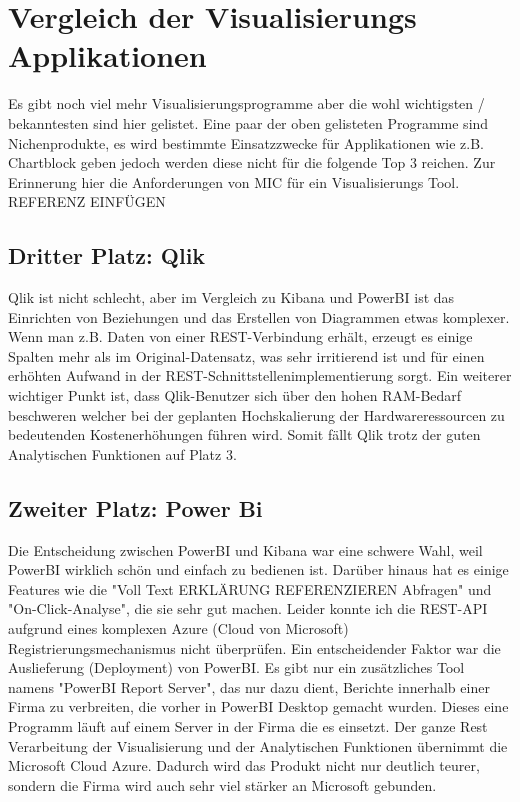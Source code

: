 \section{Vergleich der Visualisierungs Applikationen}
Es gibt noch viel mehr Visualisierungsprogramme aber die wohl wichtigsten / bekanntesten sind hier gelistet. Eine paar der oben gelisteten Programme sind Nichenprodukte, es wird bestimmte Einsatzzwecke für Applikationen wie z.B. Chartblock geben jedoch werden diese nicht für die folgende Top 3 reichen. 
Zur Erinnerung hier die Anforderungen von MIC für ein Visualisierungs Tool. REFERENZ EINFÜGEN
\subsection{Dritter Platz: Qlik}
Qlik ist nicht schlecht, aber im Vergleich zu Kibana und PowerBI ist das Einrichten von Beziehungen und das Erstellen von Diagrammen etwas komplexer. Wenn man z.B. Daten von einer REST-Verbindung erhält, erzeugt es einige Spalten mehr als im Original-Datensatz, was sehr irritierend ist und für einen erhöhten Aufwand in der REST-Schnittstellenimplementierung sorgt. Ein weiterer wichtiger Punkt ist, dass Qlik-Benutzer sich über den hohen RAM-Bedarf beschweren welcher bei der geplanten Hochskalierung der Hardwareressourcen zu bedeutenden Kostenerhöhungen führen wird. Somit fällt Qlik trotz der guten Analytischen Funktionen auf Platz 3.
\subsection{Zweiter Platz: Power Bi}
Die Entscheidung zwischen PowerBI und Kibana war eine schwere Wahl, weil PowerBI wirklich schön und einfach zu bedienen ist. Darüber hinaus hat es einige Features wie die "Voll Text ERKLÄRUNG REFERENZIEREN Abfragen" und "On-Click-Analyse", die sie sehr gut machen. Leider konnte ich die REST-API aufgrund eines komplexen Azure (Cloud von Microsoft) Registrierungsmechanismus nicht überprüfen. Ein entscheidender Faktor war die Auslieferung (Deployment) von PowerBI. Es gibt nur ein zusätzliches Tool namens "PowerBI Report Server", das nur dazu dient, Berichte innerhalb einer Firma zu verbreiten, die vorher in PowerBI Desktop gemacht wurden. Dieses eine Programm läuft auf einem Server in der Firma die es einsetzt. Der ganze Rest Verarbeitung der Visualisierung und der Analytischen Funktionen übernimmt die Microsoft Cloud Azure. Dadurch wird das Produkt nicht nur deutlich teurer, sondern die Firma wird auch sehr viel stärker an Microsoft gebunden.
